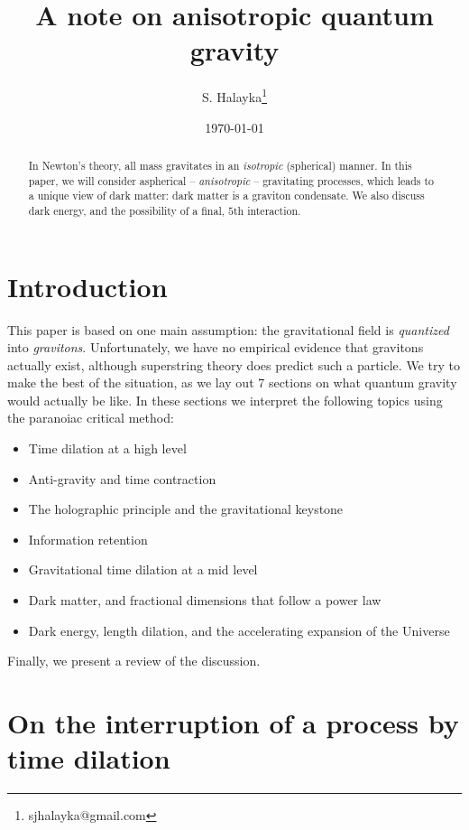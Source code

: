 \documentclass[12pt]{article}
\title{A note on anisotropic quantum gravity}
\author{S. Halayka\footnote{sjhalayka@gmail.com}}
\date{\today\;\currenttime}
\begin{document}
 
\maketitle

\begin{abstract}
In Newton's theory, all mass gravitates in an {\textit{isotropic}} (spherical) manner.
In this paper, we will consider aspherical -- {\textit{anisotropic}} -- gravitating processes, which leads to a unique view of dark matter: dark matter is a graviton condensate.
We also discuss dark energy, and the possibility of a final, $5$th interaction.
\end{abstract}





\section{Introduction}

This paper is based on one main assumption: the gravitational field is {\textit{quantized}} into {\textit{gravitons}}.
Unfortunately, we have no empirical evidence that gravitons actually exist, although superstring theory \cite{wray} does predict such a particle.
We try to make the best of the situation, as we lay out 7 sections on what quantum gravity would actually be like.
In these sections we interpret the following topics using the paranoiac critical method:
\begin{itemize}
\item Time dilation at a high level
\item Anti-gravity and time contraction
\item The holographic principle and the gravitational keystone
\item Information retention
\item Gravitational time dilation at a mid level
\item Dark matter, and fractional dimensions that follow a power law
\item Dark energy, length dilation, and the accelerating expansion of the Universe
\end{itemize}

Finally, we present a review of the discussion.









\section{On the interruption of a process by time dilation}
\end{document}
